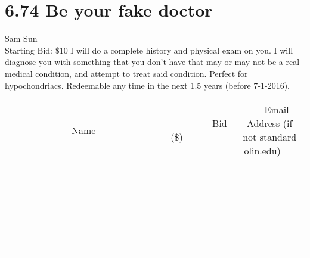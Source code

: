 \documentclass[11pt]{article}
\begin{document}
\section*{6.74 Be your fake doctor}
Sam Sun
\\
Starting Bid: \$10
\newline
I will do a complete history and physical exam on you.  I will diagnose you with something that you don't have that may or may not be a real medical condition, and attempt to treat said condition.  Perfect for hypochondriacs.  Redeemable any time in the next 1.5 years (before 7-1-2016).
\\[6ex]
\begin{tabular}{c c c}
~~~~~~~~~~~~~Name~~~~~~~~~~~~~ & ~~~~~~~~~Bid (\$)~~~~~~~~~  & ~~~Email Address (if not standard olin.edu)~~~\\
 & & \\
\hline
 & & \\
\hline
 & & \\
\hline
 & & \\
\hline
 & & \\
\hline
 & & \\
\hline
 & & \\
\hline
 & & \\
\hline
 & & \\
\hline
 & & \\
\hline
 & & \\
\hline
 & & \\
\hline
 & & \\
\hline
 & & \\
\hline
 & & \\
\hline
 & & \\
\hline
 & & \\
\hline
 & & \\
\hline
 & & \\
\hline
 & & \\
\hline
 & & \\
\hline
 & & \\
\hline
 & & \\
\hline
 & & \\
\hline
 & & \\
\hline
 & & \\
\hline
\end{tabular}
\newpage
\end{document}
